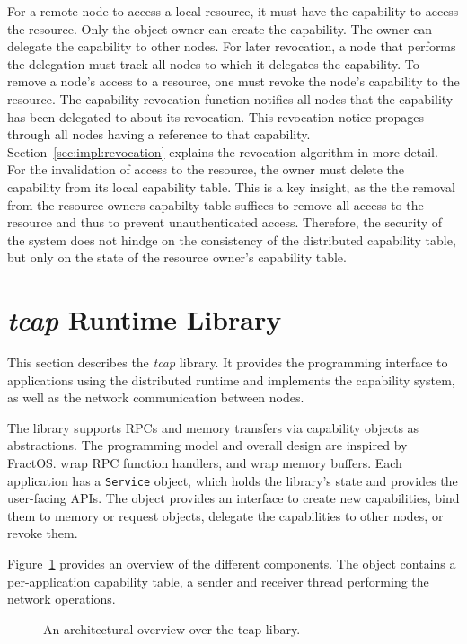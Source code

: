 For a remote node to access a local resource, it must have the capability to access the resource. Only the object owner can create the capability. The owner can delegate the capability to other nodes. For later revocation, a node that performs the delegation must track all nodes to which it delegates the capability. To remove a node's access to a resource, one must revoke the node's capability to the resource. The capability revocation function notifies all nodes that the capability has been delegated to about its revocation. This revocation notice propages through all nodes having a reference to that capability. Section~\ref{sec:impl:revocation} explains the revocation algorithm in more detail. For the invalidation of access to the resource, the owner must delete the capability from its local capability table. This is a key insight, as the the removal from the resource owners capabilty table suffices to remove all access to the resource and thus to prevent unauthenticated access. Therefore, the security of the system does not hindge on the consistency of the distributed capability table, but only on the state of the resource owner's capability table.


\section{\emph{tcap} Runtime Library}
This section describes the \emph{tcap} library. It provides the programming interface to applications using the distributed runtime and implements the capability system, as well as the network communication between nodes.

The library supports \acp{RPC} and memory transfers via capability objects as abstractions. The programming model and overall design are inspired by FractOS.\@
{} wrap \ac{RPC} function handlers, and  wrap memory buffers. Each application has a \texttt{Service} object, which holds the library's state and provides the user-facing \acp{API}. The  object provides an interface to create new capabilities, bind them to memory or request objects, delegate the capabilities to other nodes, or revoke them.

Figure~\ref{fig:tcap-arch} provides an overview of the different components.  The  object contains a per-application capability table, a sender and receiver thread performing the network operations.

\begin{figure}[h!]
  \centering
  \resizebox{\textwidth}{!}{
    
  }
  \caption{\label{fig:tcap-arch} An architectural overview over the tcap libary.}
\end{figure}

